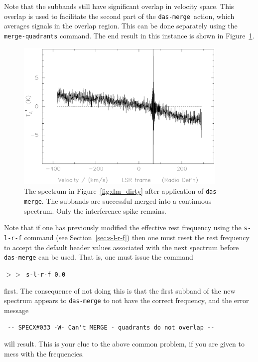 \documentclass[11pt,twoside]{article}
\newcommand{\dm}{{\tt das-merge}}
\newcommand{\SP}{{$>\!>$}}
\begin{document}
Note that the subbands still have significant overlap in velocity
space. This overlap is used to facilitate the second part of the \dm\
action, which averages signals in the overlap region. This can be done
separately using the {\tt merge-quadrants} command. The end result in this
instance is shown in Figure~\ref{fig:dm_dasmerge}.
%
\begin{figure}[htb]
\centering
\includegraphics[width=4.0in]{sc8_dm_dasmerge.ps}
\vspace*{-0.5cm}
\begin{center}
\begin{minipage}[t]{5in}
\caption[Spectrum after \dm ]
{\small{The spectrum in Figure~\ref{fig:dm_dirty} after application of
\dm .  The subbands are successful merged into a continuous
spectrum. Only the interference spike remains.}}
\label{fig:dm_dasmerge}
\end{minipage}
\end{center}
\end{figure}

Note that if one has previously modified the effective rest frequency
using the {\tt s-l-r-f} command (see Section~\ref{sec:s-l-r-f}) then one
must reset the rest frequency
to accept the default header values associated with the next spectrum
before {\tt das-merge} can be used. That is, one must issue the
command

\SP\ {\tt s-l-r-f 0.0}

first. The consequence of not doing this is that the first subband
of the new spectrum appears to {\tt das-merge} to not have the correct
frequency, and the error message

\verb| -- SPECX#033 -W- Can't MERGE - quadrants do not overlap --|

will result. This is your clue to the above common problem, if you
are given to mess with the frequencies.
\end{document}
